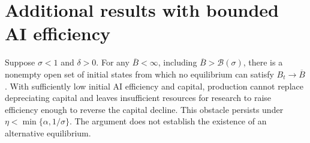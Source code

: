 \section{Additional results with bounded AI efficiency}
\label{app:rewrite-additional-bounded-results}

\begin{remark}
\label{rem:rewrite-efficiency-nonattainment}
Suppose $\sigma<1$ and $\delta>0$. For any $\overline B<\infty$,
including $\overline B>\mathcal B(\sigma)$, there is a nonempty open set
of initial states from which no equilibrium can satisfy
$B_t\to\overline B$. With sufficiently low initial AI efficiency and
capital, production cannot replace depreciating capital and leaves
insufficient resources for research to raise efficiency enough to reverse
the capital decline. This obstacle persists under
$\eta<\min\{\alpha,1/\sigma\}$.
The argument does not establish the existence of an alternative equilibrium.
\end{remark}

